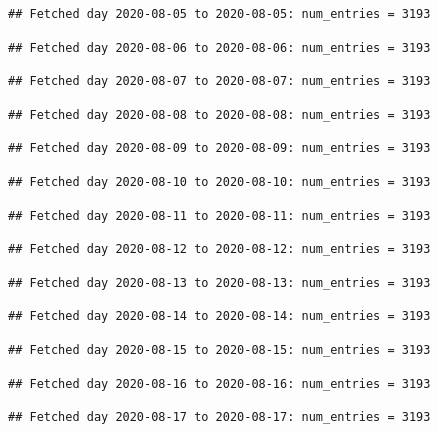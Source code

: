 \documentclass[]{article}
\begin{document}
\begin{verbatim}
## Fetched day 2020-08-05 to 2020-08-05: num_entries = 3193
\end{verbatim}

\begin{verbatim}
## Fetched day 2020-08-06 to 2020-08-06: num_entries = 3193
\end{verbatim}

\begin{verbatim}
## Fetched day 2020-08-07 to 2020-08-07: num_entries = 3193
\end{verbatim}

\begin{verbatim}
## Fetched day 2020-08-08 to 2020-08-08: num_entries = 3193
\end{verbatim}

\begin{verbatim}
## Fetched day 2020-08-09 to 2020-08-09: num_entries = 3193
\end{verbatim}

\begin{verbatim}
## Fetched day 2020-08-10 to 2020-08-10: num_entries = 3193
\end{verbatim}

\begin{verbatim}
## Fetched day 2020-08-11 to 2020-08-11: num_entries = 3193
\end{verbatim}

\begin{verbatim}
## Fetched day 2020-08-12 to 2020-08-12: num_entries = 3193
\end{verbatim}

\begin{verbatim}
## Fetched day 2020-08-13 to 2020-08-13: num_entries = 3193
\end{verbatim}

\begin{verbatim}
## Fetched day 2020-08-14 to 2020-08-14: num_entries = 3193
\end{verbatim}

\begin{verbatim}
## Fetched day 2020-08-15 to 2020-08-15: num_entries = 3193
\end{verbatim}

\begin{verbatim}
## Fetched day 2020-08-16 to 2020-08-16: num_entries = 3193
\end{verbatim}

\begin{verbatim}
## Fetched day 2020-08-17 to 2020-08-17: num_entries = 3193
\end{verbatim}
\end{document}
